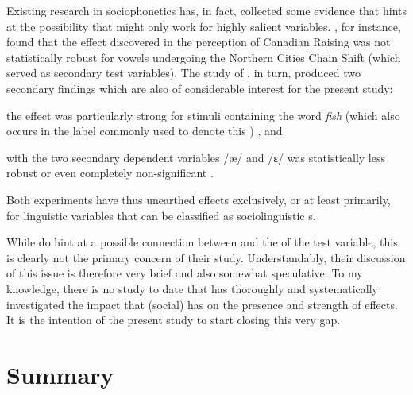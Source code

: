 Existing research in sociophonetics has, in fact, collected some evidence that hints at the possibility that   might only work for highly salient variables.
\textcite[cf.][69--75]{niedzielski1999}, for instance, found that the  effect discovered in the perception of Canadian Raising was not statistically robust for vowels undergoing the Northern Cities Chain Shift (which served as secondary test variables).
The \citeyear{hayetal2006a} study of \citeauthor{hayetal2006a}, in turn, produced two secondary findings which are also of considerable interest for the present study:
\begin{inparaenum}[(1)]
	\item the  effect was particularly strong for stimuli containing the word \emph{fish} (which also occurs in the label commonly used to denote this ) \parencite[cf.][363]{hayetal2006a}, and
	\item {} with the two secondary dependent variables /æ/ and /ɛ/ was statistically less robust or even completely non-significant \parencite[cf.][367]{hayetal2006a}.
\end{inparaenum}
Both experiments have thus unearthed  effects exclusively, or at least primarily, for linguistic variables that can be classified as sociolinguistic s.

While \textcite{hayetal2006a} do hint at a possible connection between   and the  of the test variable, this is clearly not the primary concern of their study.
Understandably, their discussion of this issue is therefore very brief and also somewhat speculative.
To my knowledge, there is no study to date that has thoroughly and systematically investigated the impact that (social)  has on the presence and strength of   effects.
It is the intention of the present study to start closing this very gap.

\section{Summary}

